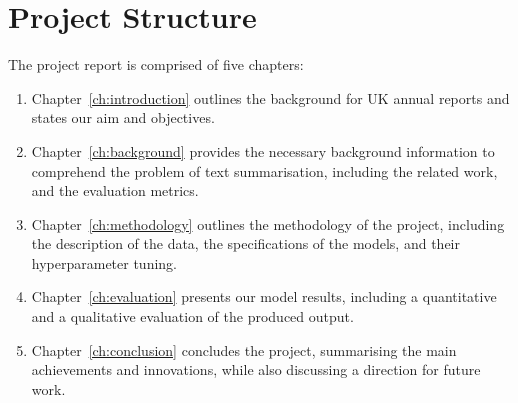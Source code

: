 \section{Project Structure}\label{sec:project-structure}
The project report is comprised of five chapters:
\begin{enumerate}
    \item Chapter~\ref{ch:introduction} outlines the background for UK annual reports and states our aim and objectives.
    \item Chapter~\ref{ch:background} provides the necessary background information to comprehend the problem of text summarisation, including the related work, and the evaluation metrics.
    \item Chapter~\ref{ch:methodology} outlines the methodology of the project, including the description of the data, the specifications of the models, and their hyperparameter tuning.
    \item Chapter~\ref{ch:evaluation} presents our model results, including a quantitative and a qualitative evaluation of the produced output.
    \item Chapter~\ref{ch:conclusion} concludes the project, summarising the main achievements and innovations, while also discussing a direction for future work.
\end{enumerate}
